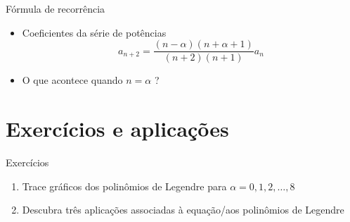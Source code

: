 \documentclass[
size=17pt,
paper=smartboard,
mode=present,
display=slidesnotes,
style=paintings,
nopagebreaks,
blackslide,
fleqn]{powerdot}
\begin{document}
      \begin{slide}[toc=]{Fórmula de recorrência}
        \begin{itemize}
		\item Coeficientes da série de potências
			\begin{equation}
				a_{n+2} = \frac{(n-\alpha)(n+\alpha+1)}{(n+2)(n+1)} a_n
			\end{equation}
		\item O que acontece quando $n=\alpha$ ?
          \end{itemize}
       \end{slide}
  
   \section[ slide = false ]{Exercícios e aplicações}
      \begin{slide}[toc=]{Exercícios}
         \begin{enumerate}
            \item Trace gráficos dos polinômios de Legendre para $\alpha=0,1,2,\dots, 8$
	    \item Descubra três aplicações associadas à equação/aos polinômios de Legendre
            \end{enumerate}
      \end{slide}
      
\end{document}
